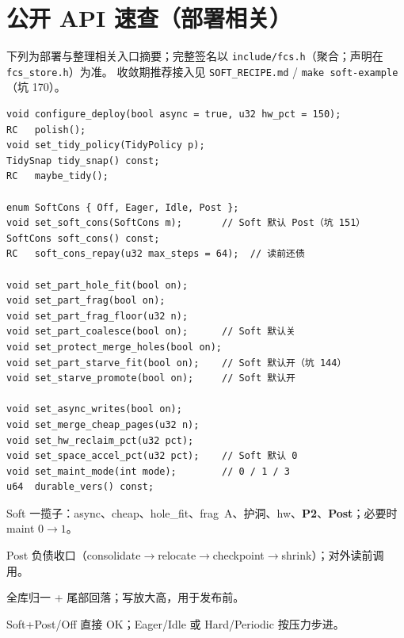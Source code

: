 \section{公开 API 速查（部署相关）}
\label{app:api}

下列为部署与整理相关入口摘要；完整签名以 \texttt{include/fcs.h}（聚合；声明在 \texttt{fcs\_store.h}）为准。
收敛期推荐接入见 \texttt{SOFT\_RECIPE.md} / \texttt{make soft-example}（坑 170）。

\begin{lstlisting}[language=fcsapi,caption={整理、Post 与养洞旋钮}]
void configure_deploy(bool async = true, u32 hw_pct = 150);
RC   polish();
void set_tidy_policy(TidyPolicy p);
TidySnap tidy_snap() const;
RC   maybe_tidy();

enum SoftCons { Off, Eager, Idle, Post };
void set_soft_cons(SoftCons m);       // Soft 默认 Post（坑 151）
SoftCons soft_cons() const;
RC   soft_cons_repay(u32 max_steps = 64);  // 读前还债

void set_part_hole_fit(bool on);
void set_part_frag(bool on);
void set_part_frag_floor(u32 n);
void set_part_coalesce(bool on);      // Soft 默认关
void set_protect_merge_holes(bool on);
void set_part_starve_fit(bool on);    // Soft 默认开（坑 144）
void set_starve_promote(bool on);     // Soft 默认开

void set_async_writes(bool on);
void set_merge_cheap_pages(u32 n);
void set_hw_reclaim_pct(u32 pct);
void set_space_accel_pct(u32 pct);    // Soft 默认 0
void set_maint_mode(int mode);        // 0 / 1 / 3
u64  durable_vers() const;
\end{lstlisting}

\begin{description}[leftmargin=1.4em]
  \item[\texttt{configure\_deploy}] Soft 一揽子：async、cheap、hole\_fit、frag~A、护洞、hw、\textbf{P2}、\textbf{Post}；必要时 maint $0\to 1$。
  \item[\texttt{soft\_cons\_repay}] Post 负债收口（consolidate$\to$relocate$\to$checkpoint$\to$shrink）；对外读前调用。
  \item[\texttt{polish}] 全库归一 + 尾部回落；写放大高，用于发布前。
  \item[\texttt{maybe\_tidy}] Soft+Post/Off 直接 OK；Eager/Idle 或 Hard/Periodic 按压力步进。
\end{description}
